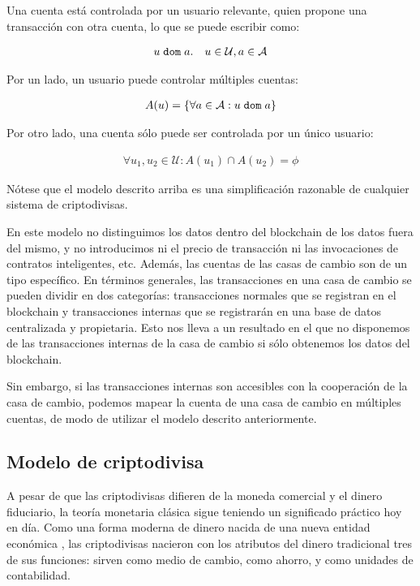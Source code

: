 Una cuenta está controlada por un usuario relevante, quien propone una transacción con otra cuenta, lo que se puede escribir como:

\begin{align}
u {\; \texttt{dom}\;} a. \quad u\in \mathcal{U}, a\in \mathcal{A}
\end{align}

\noindent Por un lado, un usuario puede controlar múltiples cuentas:

\begin{align}
A(u) = \{\forall a\in \mathcal{A} : u {\; \texttt{dom}\;} a\}
\end{align}

\noindent Por otro lado, una cuenta sólo puede ser controlada por un único usuario:

\begin{align}
\forall u_1, u_2 \in \mathcal{U} : A(u_1) \cap A(u_2) = \phi
\end{align}

Nótese que el modelo descrito arriba es una simplificación razonable de cualquier sistema de criptodivisas.

En este modelo no distinguimos los datos dentro del blockchain de los datos fuera del mismo, y no introducimos ni el precio de transacción ni las invocaciones de contratos inteligentes, etc. Además, las cuentas de las casas de cambio son de un tipo específico. En términos generales, las transacciones en una casa de cambio se pueden dividir en dos categorías: transacciones normales que se registran en el blockchain y transacciones internas que se registrarán en una base de datos centralizada y propietaria. Esto nos lleva a un resultado en el que no disponemos de las transacciones internas de la casa de cambio si sólo obtenemos los datos del blockchain.

Sin embargo, si las transacciones internas son accesibles con la cooperación de la casa de cambio, podemos mapear la cuenta de una casa de cambio en múltiples cuentas, de modo de utilizar el modelo descrito anteriormente.

\subsection{Modelo de criptodivisa}
A pesar de que las criptodivisas difieren de la moneda comercial y el dinero fiduciario, la teoría monetaria clásica sigue teniendo un significado práctico hoy en día. Como una forma moderna de dinero nacida de una nueva entidad económica \cite{swan2015blockchain}, las criptodivisas nacieron con los atributos del dinero tradicional tres de sus funciones: sirven como medio de cambio, como ahorro, y como unidades de contabilidad.

